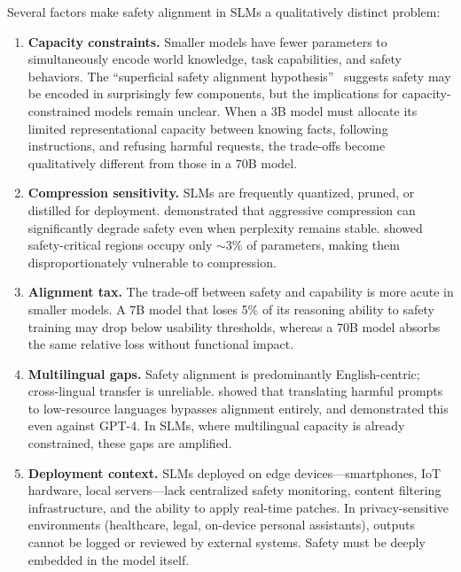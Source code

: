 \documentclass[12pt,a4paper]{article}
\begin{document}
Several factors make safety alignment in SLMs a qualitatively distinct problem:

\begin{enumerate}[leftmargin=*]
    \item \textbf{Capacity constraints.} Smaller models have fewer parameters to simultaneously encode world knowledge, task capabilities, and safety behaviors. The ``superficial safety alignment hypothesis''~\citep{yi2024superficial} suggests safety may be encoded in surprisingly few components, but the implications for capacity-constrained models remain unclear. When a 3B model must allocate its limited representational capacity between knowing facts, following instructions, and refusing harmful requests, the trade-offs become qualitatively different from those in a 70B model.
    \item \textbf{Compression sensitivity.} SLMs are frequently quantized, pruned, or distilled for deployment. \citet{hong2024compressed} demonstrated that aggressive compression can significantly degrade safety even when perplexity remains stable. \citet{wei2024brittleness} showed safety-critical regions occupy only ${\sim}3\%$ of parameters, making them disproportionately vulnerable to compression.
    \item \textbf{Alignment tax.} The trade-off between safety and capability is more acute in smaller models. A 7B model that loses 5\% of its reasoning ability to safety training may drop below usability thresholds, whereas a 70B model absorbs the same relative loss without functional impact.
    \item \textbf{Multilingual gaps.} Safety alignment is predominantly English-centric; cross-lingual transfer is unreliable. \citet{deng2024multilingual} showed that translating harmful prompts to low-resource languages bypasses alignment entirely, and \citet{yong2024lowresource} demonstrated this even against GPT-4. In SLMs, where multilingual capacity is already constrained, these gaps are amplified.
    \item \textbf{Deployment context.} SLMs deployed on edge devices---smartphones, IoT hardware, local servers---lack centralized safety monitoring, content filtering infrastructure, and the ability to apply real-time patches. In privacy-sensitive environments (healthcare, legal, on-device personal assistants), outputs cannot be logged or reviewed by external systems. Safety must be deeply embedded in the model itself.
\end{enumerate}
\end{document}
